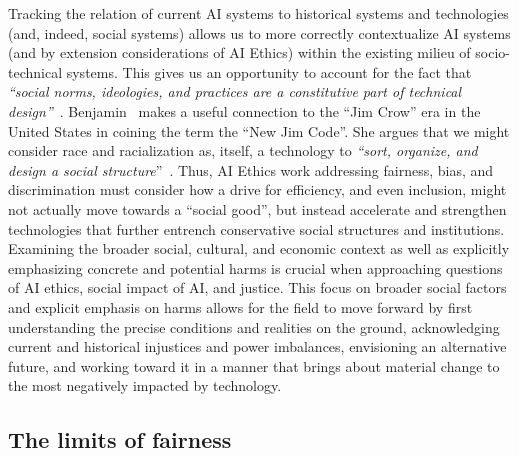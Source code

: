 \documentclass[manuscript]{acmart}
\begin{document}
Tracking the relation of current AI systems to historical systems and technologies (and, indeed, social systems) allows us to more correctly contextualize AI systems (and by extension considerations of AI Ethics) within the existing milieu of socio-technical systems. This gives us an opportunity to account for the fact that \textit{``social norms, ideologies, and practices are a constitutive part of technical design''}~\cite [p.41]{benjamin2019race}. Benjamin~\cite{benjamin2019race} makes a useful connection to the ``Jim Crow'' era in the United States in coining the term the ``New Jim Code''. She argues that we might consider race and racialization as, itself, a technology to \textit{``sort, organize, and design a social structure}''~\cite[p.91]{benjamin2019race}. Thus, AI Ethics work addressing fairness, bias, and discrimination must consider how a drive for efficiency, and even inclusion, might not actually move towards a ``social good'', but instead accelerate and strengthen technologies that further entrench conservative social structures and institutions.  
Examining the broader social, cultural, and economic context as well as explicitly emphasizing concrete and potential harms is crucial when approaching questions of AI ethics, social impact of AI, and justice. This focus on broader social factors and explicit emphasis on harms allows for the field to move forward by first understanding the precise conditions and realities on the ground, acknowledging current and historical injustices and power imbalances, envisioning an alternative future, and working toward it in a manner that brings about material change to the most negatively impacted by technology. 

\subsection{The limits of fairness}
\label{sect:the_limits}
\end{document}
